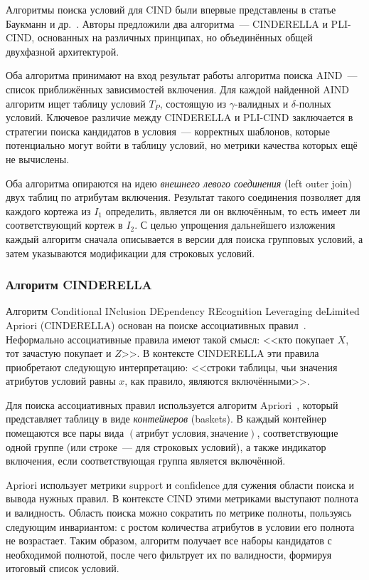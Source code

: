 Алгоритмы поиска условий для CIND были впервые представлены в статье Баукманн и др.~\cite{brink2012cind}. Авторы предложили два алгоритма~--- CINDERELLA и PLI-CIND, основанных на различных принципах, но объединённых общей двухфазной архитектурой.

Оба алгоритма принимают на вход результат работы алгоритма поиска AIND~--- список приближённых зависимостей включения. Для каждой найденной AIND алгоритм ищет таблицу условий $T_P$, состоящую из $\gamma$-валидных и $\delta$-полных условий. Ключевое различие между CINDERELLA и PLI-CIND заключается в стратегии поиска кандидатов в условия~--- корректных шаблонов, которые потенциально могут войти в таблицу условий, но метрики качества которых ещё не вычислены.

Оба алгоритма опираются на идею \emph{внешнего левого соединения} (left outer join) двух таблиц по атрибутам включения. Результат такого соединения позволяет для каждого кортежа из $I_1$ определить, является ли он включённым, то есть имеет ли соответствующий кортеж в $I_2$. С целью упрощения дальнейшего изложения каждый алгоритм сначала описывается в версии для поиска групповых условий, а затем указываются модификации для строковых условий.

\subsubsection{Алгоритм CINDERELLA}

Алгоритм Conditional INclusion DEpendency REcognition Leveraging deLimited Apriori (CINDERELLA) основан на поиске ассоциативных правил~\cite{brink2012cind}. Неформально ассоциативные правила имеют такой смысл: <<кто покупает $X$, тот зачастую покупает и $Z$>>. В контексте CINDERELLA эти правила приобретают следующую интерпретацию: <<строки таблицы, чьи значения атрибутов условий равны $x$, как правило, являются включёнными>>.

Для поиска ассоциативных правил используется алгоритм Apriori~\cite{agrawal1994fast}, который представляет таблицу в виде \emph{контейнеров} (baskets). В каждый контейнер помещаются все пары вида $(\text{атрибут условия}, \text{значение})$, соответствующие одной группе (или строке~--- для строковых условий), а также индикатор включения, если соответствующая группа является включённой.

Apriori использует метрики support и confidence для сужения области поиска и вывода нужных правил. В контексте CIND этими метриками выступают полнота и валидность. Область поиска можно сократить по метрике полноты, пользуясь следующим инвариантом: с ростом количества атрибутов в условии его полнота не возрастает. Таким образом, алгоритм получает все наборы кандидатов с необходимой полнотой, после чего фильтрует их по валидности, формируя итоговый список условий.

